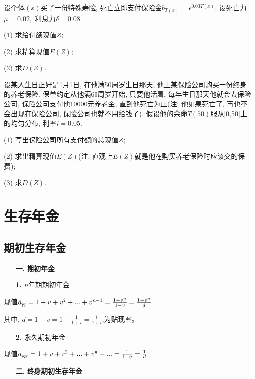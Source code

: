\documentclass[a4paper,10pt]{ctexbook}
\makeatletter
\newcommand{\hei}{\CJKfamily{hei}}      %
\DeclareRobustCommand{\annu}[1]{_{%
    \def\arraystretch{0}%
    \setlength\arraycolsep{1pt}%
    \setlength\arrayrulewidth{.2pt}%
    \begin{array}[b]{@{}c|}\hline
        \\[\arraycolsep]%
        \scriptstyle #1%
    \end{array}%
}}
\makeatother
\begin{document}
\begin{exs}
    设个体$(x)$买了一份特殊寿险, 死亡立即支付保险金$b_{T(x)}=e^{0.03T(x)}.$ 设死亡力$\mu=0.02,$ 利息力$\delta=0.08.$

    (1) 求给付额现值$Z;$

    (2) 求精算现值$E(Z);$

    (3) 求$D(Z).$
\end{exs}

\begin{exs}
    设某人生日正好是1月1日, 在他满50周岁生日那天, 他上某保险公司购买一份终身的养老保险. 保单约定从他满60周岁开始, 只要他活着, 每年生日那天他就会去保险公司, 保险公司支付他10000元养老金, 直到他死亡为止(注: 他如果死亡了, 再也不会出现在保险公司, 保险公司也就不用给钱了). 假设他的余命$T(50)$服从[0,50]上的均匀分布, 利率$i=0.05.$

    (1) 写出保险公司所有支付额的总现值$Z$;

    (2) 求出精算现值$E(Z)$(注: 直观上$E(Z)$就是他在购买养老保险时应该交的保费);

    (3) 求$D(Z).$
\end{exs}

\chapter{生存年金}
\section{期初生存年金}
\begin{itemize}
    \item[{\bf\hei 一.}]{\bf\hei 期初年金}
\end{itemize}
\begin{itemize}
    \item[{\bf\hei 1.}]$n$年期期初年金
\end{itemize}

现值$\ddot a_{\annu n}=1+v+v^2+...+v^{n-1}=\frac{1-v^n}{1-v}=\frac{1-v^n}{d}$

其中, $d=1-v=1-\frac{1}{1+i}=\frac{i}{1+i}$,为贴现率。
\begin{itemize}
    \item[{\bf\hei 2.}]永久期初年金
\end{itemize}

现值$a_{\annu {\infty}}=1+v+v^2+...+v^n+...=\frac{1}{1-v}=\frac{1}{d}$
\begin{itemize}
    \item[{\bf\hei 二.}]{\bf\hei 终身期初生存年金}
\end{itemize}
\end{document}
